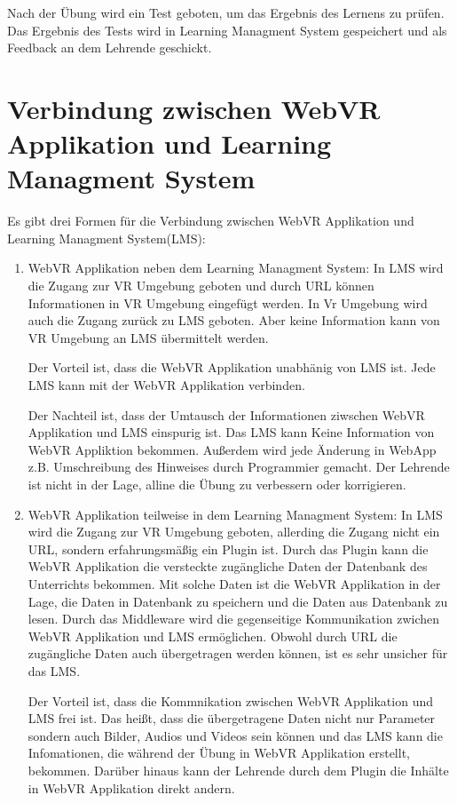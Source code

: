 Nach der Übung wird ein Test geboten, um das Ergebnis des Lernens zu prüfen. Das Ergebnis des Tests wird in Learning Managment System gespeichert und als Feedback an dem Lehrende geschickt.

\section{Verbindung zwischen WebVR Applikation und Learning Managment System}
Es gibt drei Formen für die Verbindung zwischen WebVR Applikation und Learning Managment System(LMS):
\begin{enumerate}
    \item WebVR Applikation neben dem Learning Managment System:
     \subitem In LMS wird die Zugang zur VR Umgebung geboten und durch URL können Informationen in VR Umgebung eingefügt werden. In Vr Umgebung wird auch die Zugang zurück zu LMS geboten. Aber keine Information kann von VR Umgebung an LMS übermittelt werden.
     
     Der Vorteil ist, dass die WebVR Applikation unabhänig von LMS ist. Jede LMS kann mit der WebVR Applikation verbinden.
     
     Der Nachteil ist, dass der Umtausch der Informationen ziwschen WebVR Applikation und LMS einspurig ist. Das LMS kann Keine Information von WebVR Appliktion bekommen. Außerdem wird jede Änderung in WebApp z.B. Umschreibung des Hinweises durch Programmier gemacht. Der Lehrende ist nicht in der Lage, alline die Übung zu verbessern oder korrigieren.
     
    \item WebVR Applikation teilweise in dem Learning Managment System:
     \subitem In LMS wird die Zugang zur VR Umgebung geboten, allerding die Zugang nicht ein URL, sondern erfahrungsmäßig ein Plugin ist. Durch das Plugin kann die WebVR Applikation die versteckte zugängliche Daten der Datenbank des Unterrichts bekommen. Mit solche Daten ist die WebVR Applikation in der Lage, die Daten in Datenbank zu speichern und die Daten aus Datenbank zu lesen. Durch das Middleware wird die gegenseitige Kommunikation zwichen WebVR Applikation und LMS ermöglichen. Obwohl durch URL die zugängliche Daten auch übergetragen werden können, ist es sehr unsicher für das LMS.
     
     Der Vorteil ist, dass die Kommnikation zwischen WebVR Applikation und LMS frei ist. Das heißt, dass die übergetragene Daten nicht nur Parameter sondern auch Bilder, Audios und Videos sein können und das LMS kann die Infomationen, die während der Übung in WebVR Applikation erstellt, bekommen. Darüber hinaus kann der Lehrende durch dem Plugin die Inhälte in WebVR Applikation direkt andern.
     

\end{enumerate}
